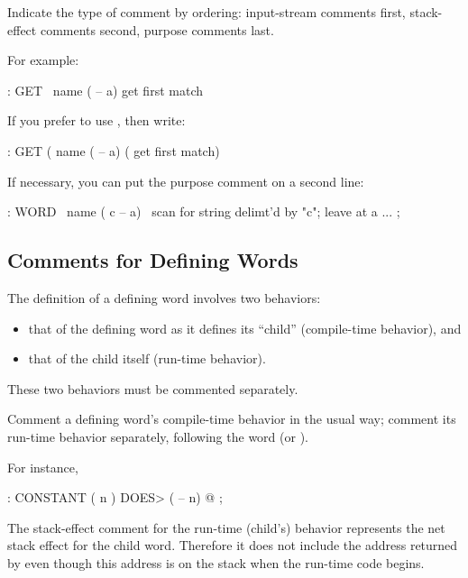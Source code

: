 \begin{tip}
Indicate the type of comment by ordering: input-stream comments first,
stack-effect comments second, purpose comments last.
\end{tip}
For example:
\begin{Code}
: GET   \   name   ( -- a)   get first match
\end{Code}
If you prefer to use \forth{(}, then write:
\begin{Code}
: GET   (   name  ( -- a)    ( get first match)
\end{Code}
If necessary, you can put the purpose comment on a second line:
\begin{Code}
: WORD   \   name   ( c -- a)
   \ scan for string delimt'd by "c"; leave at a
   ...  ;
\end{Code}

\subsection{Comments for Defining Words}
The definition of a defining word involves two behaviors:

\begin{itemize}
\item that of the defining word as it defines its ``child''
(compile-time behavior), and
\item that of the child itself (run-time behavior).
\end{itemize}
These two behaviors must be commented separately.

\begin{tip}
Comment a defining word's compile-time behavior in the usual way;
comment its run-time behavior separately, following the word
 (or ).
\end{tip}
For instance,
\begin{Code}
: CONSTANT  ( n )
   DOES>  ( -- n)  @ ;
\end{Code}
The stack-effect comment for the run-time (child's) behavior
represents the net stack effect for the child word.  Therefore it does
not include the address returned by  even though this
address is on the stack when the run-time code begins.

